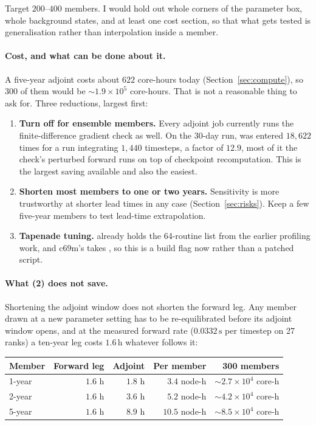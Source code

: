 Target $200$--$400$ members. I would hold out whole corners of the parameter
box, whole background states, and at least one cost section, so that what gets
tested is generalisation rather than interpolation inside a member.

\paragraph{Cost, and what can be done about it.}
A five-year adjoint costs about $622$ core-hours today
(Section~\ref{sec:compute}), so $300$ of them would
be $\sim\!1.9\times10^{5}$ core-hours. That is not a reasonable thing to ask
for. Three reductions, largest first:

\begin{enumerate}
  \item \textbf{Turn off  for ensemble members.} Every adjoint
        job currently runs the finite-difference gradient check as well. On the
        30-day run,  was entered $18{,}622$ times for a run
        integrating $1{,}440$ timesteps, a factor of $12.9$, most of it the
        check's perturbed forward runs on top of checkpoint recomputation. This
        is the largest saving available and also the easiest.
  \item \textbf{Shorten most members to one or two years.} Sensitivity is more
        trustworthy at shorter lead times in any case
        (Section~\ref{sec:risks}). Keep a few five-year members to test
        lead-time extrapolation.
  \item \textbf{Tapenade  tuning.}
         already holds the 64-routine list
        from the earlier profiling work, and c69m's  takes
        , so this is a build flag now rather than a patched
        script.
\end{enumerate}

\paragraph{What (2) does not save.}
Shortening the adjoint window does not shorten the forward leg. Any member drawn
at a new parameter setting has to be re-equilibrated before its adjoint window
opens, and at the measured forward rate ($0.0332\,\mathrm{s}$ per timestep on 27
ranks) a ten-year leg costs $1.6\,\mathrm{h}$ whatever follows it:

\begin{center}
\begin{tabular}{lrrrr}
\toprule
\textbf{Member} & \textbf{Forward leg} & \textbf{Adjoint} &
\textbf{Per member} & \textbf{300 members}\\
\midrule
1-year & $1.6$ h & $1.8$ h & $3.4$ node-h  & $\sim\!2.7\times10^{4}$ core-h\\
2-year & $1.6$ h & $3.6$ h & $5.2$ node-h  & $\sim\!4.2\times10^{4}$ core-h\\
5-year & $1.6$ h & $8.9$ h & $10.5$ node-h & $\sim\!8.5\times10^{4}$ core-h\\
\bottomrule
\end{tabular}
\end{center}

